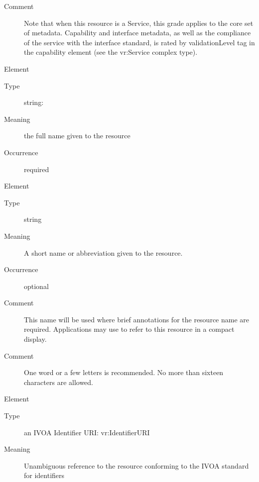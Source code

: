 \documentclass[11pt,a4paper]{ivoa}
\begin{document}
\begin{generated}
\begin{bigdescription}
\begin{description}
\item[Comment] 
                  Note that when this resource is a Service, this
                  grade applies to the core set of metadata.
                  Capability and interface metadata, as well as the
                  compliance of the service with the interface
                  standard, is rated by validationLevel tag in the 
                  capability element (see the vr:Service complex
                  type).  
               

\end{description}
\item[Element \xmlel{title}]
\begin{description}
\item[Type] string: 
\item[Meaning] 
                  the full name given to the resource
               
\item[Occurrence] required

\end{description}
\item[Element \xmlel{shortName}]
\begin{description}
\item[Type] string
\item[Meaning] 
                 A short name or abbreviation given to the resource.
               
\item[Occurrence] optional

\item[Comment] 
                 This name will be used where brief annotations for
                 the resource name are required.  Applications may 
                 use to refer to this resource in a compact display.   
               
\item[Comment] 
                 One word or a few letters is recommended.  No more
                 than sixteen characters are allowed.
               

\end{description}
\item[Element \xmlel{identifier}]
\begin{description}
\item[Type] an IVOA Identifier URI: vr:IdentifierURI
\item[Meaning] 
                  Unambiguous reference to the resource conforming to the IVOA
                  standard for identifiers
               

\end{description}
\end{bigdescription}
\end{generated}
\end{document}
